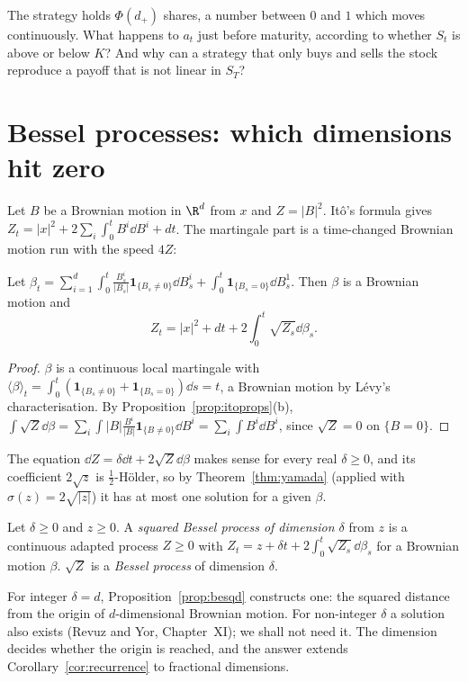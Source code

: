 \begin{think}
The strategy holds $\Phi(d_+)$ shares, a number between $0$ and $1$ which moves continuously. What happens to $a_t$ just before maturity, according to whether $S_t$ is above or below $K$? And why can a
strategy that only buys and sells the stock reproduce a payoff that is not linear in $S_T$?
\end{think}

\section{Bessel processes: which dimensions hit zero}

Let $B$ be a Brownian motion in $\R^d$ from $x$ and $Z=|B|^2$. It\^o's formula gives $Z_t=|x|^2+2\sum_i\int_0^tB^i\dd B^i+dt$. The martingale part is a time-changed Brownian motion run with the
speed $4Z$:

\begin{proposition}\label{prop:besqd}
Let $\beta_t=\sum_{i=1}^d\int_0^t\frac{B^i_s}{|B_s|}\mathbf 1_{\{B_s\ne0\}}\dd B^i_s+\int_0^t\mathbf 1_{\{B_s=0\}}\dd B^1_s$. Then $\beta$ is a Brownian motion and
\[
Z_t=|x|^2+dt+2\int_0^t\sqrt{Z_s}\dd\beta_s.
\]
\end{proposition}

\begin{proof}
$\beta$ is a continuous local martingale with $\langle\beta\rangle_t=\int_0^t(\mathbf 1_{\{B_s\ne0\}}+\mathbf 1_{\{B_s=0\}})\dd s=t$, a Brownian motion by L\'evy's characterisation. By Proposition~\ref{prop:itoprops}(b),
$\int\sqrt{Z}\dd\beta=\sum_i\int|B|\frac{B^i}{|B|}\mathbf 1_{\{B\ne0\}}\dd B^i=\sum_i\int B^i\dd B^i$, since $\sqrt Z=0$ on $\{B=0\}$.
\end{proof}

The equation $\dd Z=\delta\dd t+2\sqrt{Z}\dd\beta$ makes sense for every real $\delta\ge0$, and its coefficient $2\sqrt z$ is $\frac12$-H\"older, so by Theorem~\ref{thm:yamada} (applied with $\sigma(z)=2\sqrt{|z|}$)
it has at most one solution for a given $\beta$.

\begin{definition}\label{def:besq}
Let $\delta\ge0$ and $z\ge0$. A \emph{squared Bessel process of dimension $\delta$} from $z$ is a continuous adapted process $Z\ge0$ with $Z_t=z+\delta t+2\int_0^t\sqrt{Z_s}\dd\beta_s$ for a Brownian motion $\beta$.
$\sqrt Z$ is a \emph{Bessel process} of dimension $\delta$.
\end{definition}

For integer $\delta=d$, Proposition~\ref{prop:besqd} constructs one: the squared distance from the origin of $d$-dimensional Brownian motion. For non-integer $\delta$ a solution also exists (Revuz and Yor,
Chapter~XI); we shall not need it. The dimension decides whether the origin is reached, and the answer extends Corollary~\ref{cor:recurrence} to fractional dimensions.

